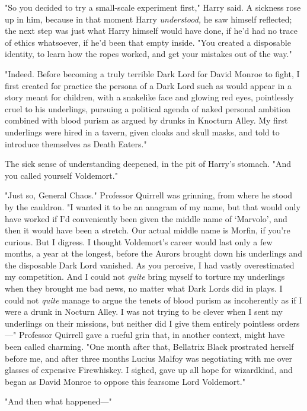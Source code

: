 "So you decided to try a small-scale experiment first," Harry said. A sickness
rose up in him, because in that moment Harry \emph{understood,} he saw himself
reflected; the next step was just what Harry himself would have done, if he'd
had no trace of ethics whatsoever, if he'd been that empty inside. "You created
a disposable identity, to learn how the ropes worked, and get your mistakes out
of the way."

"Indeed. Before becoming a truly terrible Dark Lord for David Monroe to fight,
I first created for practice the persona of a Dark Lord such as would appear in
a story meant for children, with a snakelike face and glowing red eyes,
pointlessly cruel to his underlings, pursuing a political agenda of naked
personal ambition combined with blood purism as argued by drunks in Knocturn
Alley. My first underlings were hired in a tavern, given cloaks and skull
masks, and told to introduce themselves as Death Eaters."

The sick sense of understanding deepened, in the pit of Harry's stomach. "And
you called yourself Voldemort."

"Just so, General Chaos." Professor Quirrell was grinning, from where he stood
by the cauldron. "I wanted it to be an anagram of my name, but that would only
have worked if I'd conveniently been given the middle name of `Marvolo', and
then it would have been a stretch. Our actual middle name is Morfin, if you're
curious. But I digress. I thought Voldemort's career would last only a few
months, a year at the longest, before the Aurors brought down his underlings
and the disposable Dark Lord vanished. As you perceive, I had vastly
overestimated my competition. And I could not \emph{quite} bring myself to
torture my underlings when they brought me bad news, no matter what Dark Lords
did in plays. I could not \emph{quite} manage to argue the tenets of blood
purism as incoherently as if I were a drunk in Nocturn Alley. I was not trying
to be clever when I sent my underlings on their missions, but neither did I
give them entirely pointless orders---" Professor Quirrell gave a rueful grin
that, in another context, might have been called charming. "One month after
that, Bellatrix Black prostrated herself before me, and after three months
Lucius Malfoy was negotiating with me over glasses of expensive Firewhiskey. I
sighed, gave up all hope for wizardkind, and began as David Monroe to oppose
this fearsome Lord Voldemort."

"And then what happened---"

